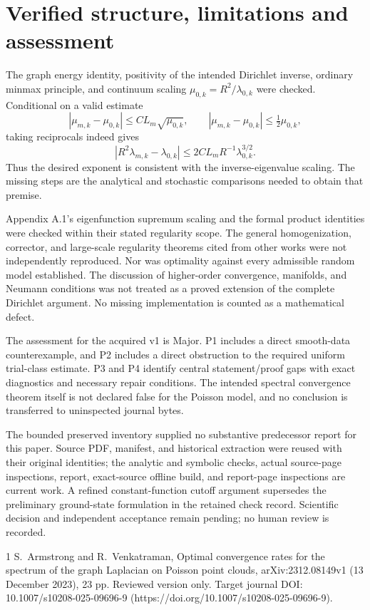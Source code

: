 \documentclass[10pt]{article}
\begin{document}
\section*{Verified structure, limitations and assessment}
The graph energy identity, positivity of the intended Dirichlet inverse, ordinary minmax principle, and continuum scaling \(\mu_{0,k}=R^2/\lambda_{0,k}\) were checked. Conditional on a valid estimate \[|\mu_{m,k}-\mu_{0,k}|\leq C L_m\sqrt{\mu_{0,k}},
 \qquad |\mu_{m,k}-\mu_{0,k}|\leq\tfrac12\mu_{0,k},\] taking reciprocals indeed gives \[|R^2\lambda_{m,k}-\lambda_{0,k}|
 \leq 2C L_m R^{-1}\lambda_{0,k}^{3/2}.\] Thus the desired exponent is consistent with the inverse-eigenvalue scaling. The missing steps are the analytical and stochastic comparisons needed to obtain that premise.\par
Appendix A.1’s eigenfunction supremum scaling and the formal product identities were checked within their stated regularity scope. The general homogenization, corrector, and large-scale regularity theorems cited from other works were not independently reproduced. Nor was optimality against every admissible random model established. The discussion of higher-order convergence, manifolds, and Neumann conditions was not treated as a proved extension of the complete Dirichlet argument. No missing implementation is counted as a mathematical defect.\par
The assessment for the acquired v1 is Major. P1 includes a direct smooth-data counterexample, and P2 includes a direct obstruction to the required uniform trial-class estimate. P3 and P4 identify central statement/proof gaps with exact diagnostics and necessary repair conditions. The intended spectral convergence theorem itself is not declared false for the Poisson model, and no conclusion is transferred to uninspected journal bytes.\par
The bounded preserved inventory supplied no substantive predecessor report for this paper. Source PDF, manifest, and historical extraction were reused with their original identities; the analytic and symbolic checks, actual source-page inspections, report, exact-source offline build, and report-page inspections are current work. A refined constant-function cutoff argument supersedes the preliminary ground-state formulation in the retained check record. Scientific decision and independent acceptance remain pending; no human review is recorded.\par
1 S. Armstrong and R. Venkatraman, Optimal convergence rates for the spectrum of the graph Laplacian on Poisson point clouds, arXiv:2312.08149v1 (13 December 2023), 23 pp. Reviewed version only. Target journal DOI: 10.1007/s10208-025-09696-9 (https://doi.org/10.1007/s10208-025-09696-9).\par
\end{document}
